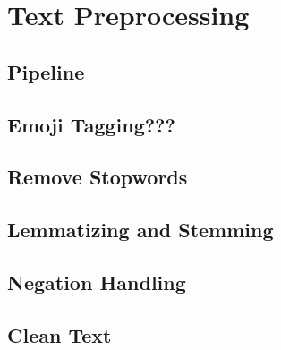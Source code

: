 
\section{Text Preprocessing}

\subsection{Pipeline}


\subsection{Emoji Tagging???}

\subsection{Remove Stopwords}

\subsection{Lemmatizing and Stemming}

\subsection{Negation Handling}

\subsection{Clean Text}

